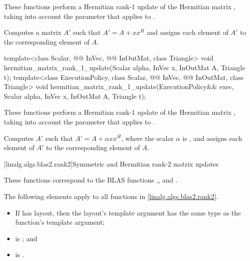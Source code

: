 \begin{itemdescr}
\pnum
These functions perform
a Hermitian rank-1 update of the Hermitian matrix ,
taking into account the  parameter
that applies to .

\pnum
\effects
Computes a matrix $A'$ such that $A' = A + x x^H$ and
assigns each element of $A'$ to the corresponding element of $A$.
\end{itemdescr}

\begin{itemdecl}
template<class Scalar, @@ InVec, @@ InOutMat, class Triangle>
  void hermitian_matrix_rank_1_update(Scalar alpha, InVec x, InOutMat A, Triangle t);
template<class ExecutionPolicy,
         class Scalar, @@ InVec, @@ InOutMat, class Triangle>
  void hermitian_matrix_rank_1_update(ExecutionPolicy&& exec,
                                      Scalar alpha, InVec x, InOutMat A, Triangle t);
\end{itemdecl}

\begin{itemdescr}
\pnum
These functions perform
a Hermitian rank-1 update of the Hermitian matrix ,
taking into account the  parameter
that applies to .

\pnum
\effects
Computes $A'$ such that
$A' = A + \alpha x x^H$, where the scalar $\alpha$ is ,
and assigns each element of $A'$ to the corresponding element of $A$.
\end{itemdescr}

[linalg.algs.blas2.rank2]{Symmetric and Hermitian rank-2 matrix updates}

\pnum
\begin{note}
These functions correspond to the BLAS functions
,,  and .
\end{note}

\pnum
The following elements apply to all functions in \ref{linalg.algs.blas2.rank2}.

\pnum
\mandates
\begin{itemize}
\item
If  has  layout,
then the layout's  template argument has
the same type as the function's  template argument;
\item
{}
is ; and
\item
{}
is .
\end{itemize}

